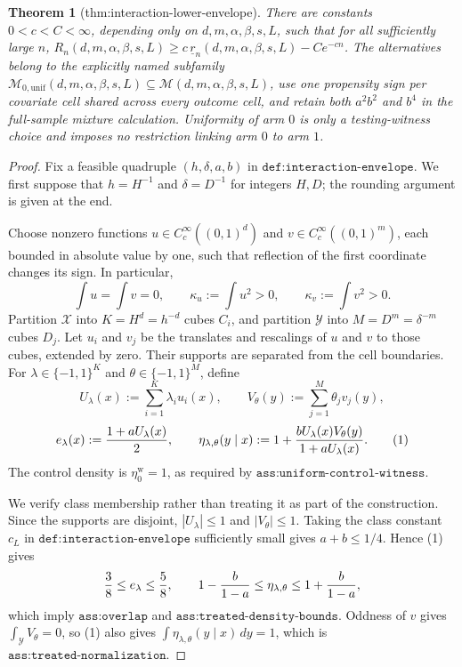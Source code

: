 \documentclass{article}
\newtheorem{theorem}{Theorem}
\begin{document}
\begin{theorem}[thm:interaction-lower-envelope]\label{thm:interaction-lower-envelope}
There are constants \(0<c<C<\infty\), depending only on \(d,m,\alpha,\beta,s,L\), such that for all sufficiently large \(n\), \(R_n(d,m,\alpha,\beta,s,L)\ge c\,\underline r_n(d,m,\alpha,\beta,s,L)-C e^{-cn}\). The alternatives belong to the explicitly named subfamily \(\mathcal M_{0,\mathrm{unif}}(d,m,\alpha,\beta,s,L)\subseteq\mathcal M(d,m,\alpha,\beta,s,L)\), use one propensity sign per covariate cell shared across every outcome cell, and retain both \(a^2b^2\) and \(b^4\) in the full-sample mixture calculation. Uniformity of arm \(0\) is only a testing-witness choice and imposes no restriction linking arm \(0\) to arm \(1\).
\end{theorem}
\begin{proof}
Fix a feasible quadruple \((h,\delta,a,b)\) in \(\texttt{def:interaction-envelope}\).  We first suppose that \(h=H^{-1}\) and \(\delta=D^{-1}\) for integers \(H,D\); the rounding argument is given at the end.

Choose nonzero functions \(u\in C_c^\infty((0,1)^d)\) and \(v\in C_c^\infty((0,1)^m)\), each bounded in absolute value by one, such that reflection of the first coordinate changes its sign.  In particular,
\[
 \int u=\int v=0,\qquad
 \kappa_u:=\int u^2>0,\qquad \kappa_v:=\int v^2>0.
\]
Partition \(\mathcal X\) into \(K=H^d=h^{-d}\) cubes \(C_i\), and partition \(\mathcal Y\) into \(M=D^m=\delta^{-m}\) cubes \(D_j\).  Let \(u_i\) and \(v_j\) be the translates and rescalings of \(u\) and \(v\) to those cubes, extended by zero.  Their supports are separated from the cell boundaries.  For \(\lambda\in\{-1,1\}^K\) and \(\theta\in\{-1,1\}^M\), define
\[
 U_\lambda(x):=\sum_{i=1}^K\lambda_i u_i(x),\qquad
 V_\theta(y):=\sum_{j=1}^M\theta_jv_j(y),
\]
\[
 e_\lambda(x):={1+aU_\lambda(x)\over2},\qquad
 \eta_{\lambda,\theta}(y\mid x)
 :=1+{bU_\lambda(x)V_\theta(y)\over1+aU_\lambda(x)}.
 \tag{1}
\]
The control density is \(\eta_0^{\mathrm w}=1\), as required by \(\texttt{ass:uniform-control-witness}\).

We verify class membership rather than treating it as part of the construction.  Since the supports are disjoint, \(|U_\lambda|\leq1\) and \(|V_\theta|\leq1\).  Taking the class constant \(c_L\) in \(\texttt{def:interaction-envelope}\) sufficiently small gives \(a+b\leq1/4\).  Hence (1) gives
\[
 {3\over8}\leq e_\lambda\leq {5\over8},\qquad
 1-{b\over1-a}\leq\eta_{\lambda,\theta}
 \leq1+{b\over1-a},
\]
which imply \(\texttt{ass:overlap}\) and \(\texttt{ass:treated-density-bounds}\).  Oddness of \(v\) gives \(\int_{\mathcal Y}V_\theta=0\), so (1) also gives \(\int\eta_{\lambda,\theta}(y\mid x)\,dy=1\), which is \(\texttt{ass:treated-normalization}\).


\end{proof}
\end{document}
